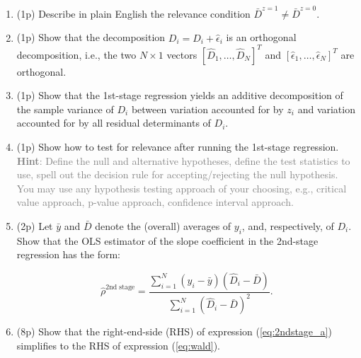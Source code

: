 \documentclass{article}
\begin{document}
\begin{enumerate}[label=\textbf{Q\arabic{enumi}}.,ref=Q\arabic{enumi}, wide=0pt, itemsep=0em, topsep=5pt, labelindent=0pt]

\item (1p) Describe in plain English the relevance condition $\bar{D}^{z=1} \neq \bar{D}^{z=0}$. 

\item (1p) Show that the decomposition $D_i = \hat{D}_i + \hat{\epsilon}_i$ is an orthogonal decomposition, i.e., the two $N \times 1$ vectors $[\hat{D}_1, \ldots, \hat{D}_N]^T$ and $[\hat{\epsilon}_1,\ldots, \hat{\epsilon}_N]^T$ are orthogonal.

\item (1p) Show that the 1st-stage regression yields an additive decomposition of the sample variance of $D_i$ between variation accounted for by $z_i$ and variation accounted for by all residual determinants of $D_i$.

\item (1p) Show how to test for relevance after running the 1st-stage regression. \textcolor{gray}{\textbf{Hint}: Define the null and alternative hypotheses, define the test statistics to use, spell out the decision rule for accepting/rejecting the null hypothesis. You may use any hypothesis testing approach of your choosing, e.g., critical value approach, p-value approach, confidence interval approach.}

\item (2p) Let $\bar{y}$ and $\bar{D}$ denote the (overall) averages of $y_i$, and, respectively, of $D_i$. Show that the OLS estimator of the slope coefficient in the 2nd-stage regression has the form:

\begin{equation}
\hat{\rho}^{\text{2nd stage}} = \frac{\sum_{i=1}^N (y_i-\bar{y})(\hat{D}_i-\bar{D})}{\sum_{i=1}^N (\hat{D}_i-\bar{D})^2}.\label{eq:2ndstage_a}
\end{equation}

\item (8p) Show that the right-end-side (RHS) of expression (\ref{eq:2ndstage_a}) simplifies to the RHS of expression (\ref{eq:wald}).


\end{enumerate}
\end{document}
